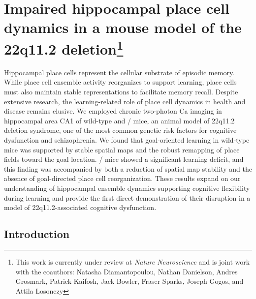 \newcommand{\Aprime}{}
\def\Aprime/{Context~A\super{$\prime$}}
\newcommand{\A}{}
\def\A/{Context~A}

\chapter[Impaired hippocampal place cell dynamics in a mouse model of the 22q11.2 deletion]{Impaired hippocampal place cell dynamics in a mouse model of the 22q11.2 deletion\footnote{This work is currently under review at \emph{Nature Neuroscience} and is joint work with the coauthors: Natasha Diamantopoulou, Nathan Danielson, Andres Grosmark, Patrick Kaifosh, Jack
Bowler, Fraser Sparks, Joseph Gogos, and Attila Losonczy}}
\label{ch:df}

Hippocampal place cells represent the cellular substrate of episodic memory. While place cell ensemble activity reorganizes to support learning, place cells must also maintain stable representations to facilitate memory recall. Despite extensive research, the learning-related role of place cell dynamics in health and disease remains elusive. We employed chronic two-photon Ca imaging in hippocampal area CA1 of wild-type and \df/ mice, an animal model of 22q11.2 deletion syndrome, one of the most common genetic risk factors for cognitive dysfunction and schizophrenia. We found that goal-oriented learning in wild-type mice was supported by stable spatial maps and the robust remapping of place fields toward the goal location. \df/ mice showed a significant learning deficit, and this finding was accompanied by both a reduction of spatial map stability and the absence of goal-directed place cell reorganization. These results expand on our understanding of hippocampal ensemble dynamics supporting cognitive flexibility during learning and provide the first direct demonstration of their disruption in a model of 22q11.2-associated cognitive dysfunction.

\section{Introduction}

